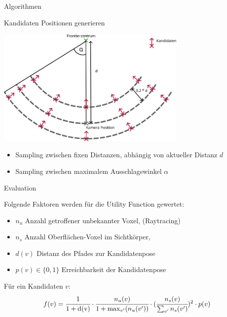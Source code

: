 \documentclass{beamer}
\begin{document}
\begin{frame}{Algorithmen}
	\begin{block}{Kandidaten Positionen generieren}

		\begin{center}
			\includegraphics[width=0.7\textwidth]{Graphics/view_point_gen_v2.png}
		\end{center}
		\begin{itemize}
			\item Sampling zwischen fixen Distanzen, abhängig von aktueller Distanz $d$
			\item Sampling zwischen maximalem Ausschlagswinkel $\alpha$
		\end{itemize}
	\end{block}

\end{frame}

\begin{frame}{Evaluation}
	\begin{block}{}
		Folgende Faktoren werden für die Utility Function gewertet:
		\begin{itemize}
			\item $n_{u}$ Anzahl getroffener unbekannter Voxel, (Raytracing)
			\item $n_s$ Anzahl Oberflächen-Voxel im Sichtkörper,
			\item $d(v)$ Distanz des Pfades zur Kandidatenpose
			\item $p(v) \in \{0,1\}$ Erreichbarkeit der Kandidatenpose
		\end{itemize}
		Für ein Kandidaten $v$:
		\[f(v) = \cfrac{1}{1 + \text{d(v)}} \cdot \cfrac{n_{u}(v)}{1 + \max_{v'}(n_{u}(v'))} \cdot (\cfrac{n_s(v)}{\sum_{v'}n_s(v')})^2 \cdot p(v)\]
	\end{block}
\end{frame}
\end{document}
